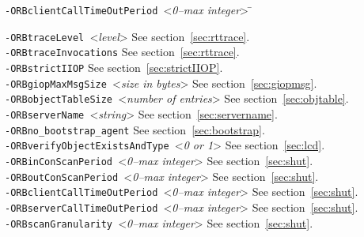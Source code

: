 \documentclass[11pt,twoside,a4paper]{book}
\newcommand{\cmdline}[1]{\texttt{#1}}
\begin{document}
\begin{tabbing}
\cmdline{-ORBclientCallTimeOutPeriod }<\textit{0--max integer}> \=\kill

\cmdline{-ORBtraceLevel }<\textit{level}>\> See section~\ref{sec:rttrace}.\\

\cmdline{-ORBtraceInvocations}           \> See section~\ref{sec:rttrace}.\\

\cmdline{-ORBstrictIIOP}                 \> See section~\ref{sec:strictIIOP}.\\

\cmdline{-ORBgiopMaxMsgSize }<\textit{size in bytes}>
                                         \> See section~\ref{sec:giopmsg}.\\

\cmdline{-ORBobjectTableSize }<\textit{number of entries}>
                                         \> See section~\ref{sec:objtable}.\\

\cmdline{-ORBserverName }<\textit{string}>
                                         \> See section~\ref{sec:servername}.\\

\cmdline{-ORBno\_bootstrap\_agent}       \> See section~\ref{sec:bootstrap}.\\

\cmdline{-ORBverifyObjectExistsAndType }<\textit{0 or 1}>
                                         \> See section~\ref{sec:lcd}.\\

\cmdline{-ORBinConScanPeriod }<\textit{0--max integer}>
                                         \> See section~\ref{sec:shut}.\\

\cmdline{-ORBoutConScanPeriod }<\textit{0--max integer}>
                                         \> See section~\ref{sec:shut}.\\

\cmdline{-ORBclientCallTimeOutPeriod }<\textit{0--max integer}>
                                         \> See section~\ref{sec:shut}.\\

\cmdline{-ORBserverCallTimeOutPeriod }<\textit{0--max integer}>
                                         \> See section~\ref{sec:shut}.\\

\cmdline{-ORBscanGranularity }<\textit{0--max integer}>
                                         \> See section~\ref{sec:shut}.\\


\end{tabbing}
\end{document}
